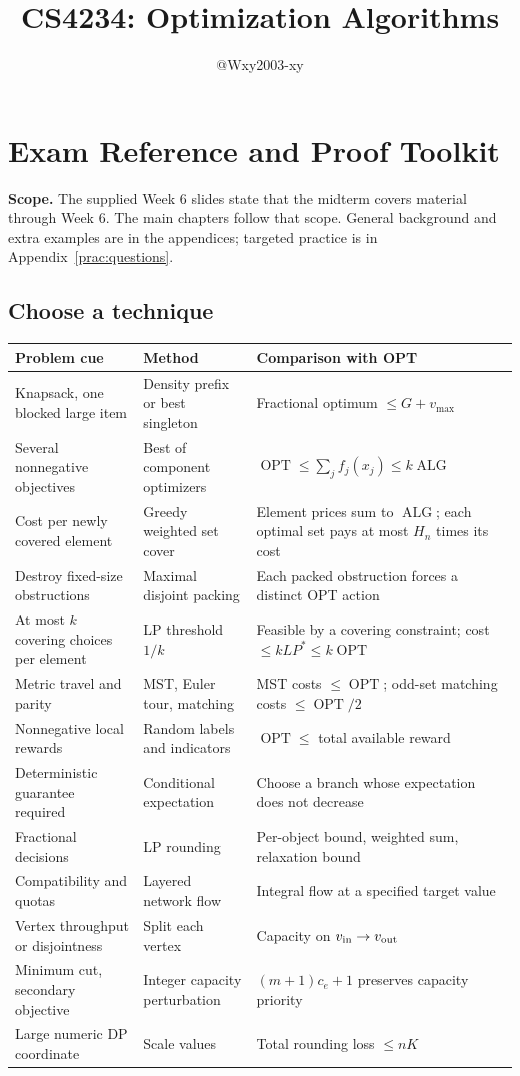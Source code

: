\documentclass[10pt]{article}
\title{CS4234: Optimization Algorithms}
\author{@Wxy2003-xy}
\date{}
\theoremstyle{definition}
\newcommand{\OPT}{\operatorname{OPT}}
\newcommand{\ALG}{\operatorname{ALG}}
\begin{document}
\maketitle\tableofcontents\clearpage

\section{Exam Reference and Proof Toolkit}
\label{ref:toolkit}
\textbf{Scope.} The supplied Week 6 slides state that the midterm covers material through
Week 6. The main chapters follow that scope. General background and extra examples are
in the appendices; targeted practice is in Appendix~\ref{prac:questions}.

\subsection{Choose a technique}
\begin{center}
\small
\begin{tabular}{P{0.25\textwidth}P{0.29\textwidth}P{0.35\textwidth}}
\toprule
\textbf{Problem cue} & \textbf{Method} & \textbf{Comparison with OPT}\\
\midrule
Knapsack, one blocked large item & Density prefix or best singleton & Fractional optimum $\le G+v_{\max}$\\
Several nonnegative objectives & Best of component optimizers & $\OPT\le\sum_j f_j(x_j)\le k\ALG$\\
Cost per newly covered element & Greedy weighted set cover & Element prices sum to $\ALG$; each optimal set pays at most $H_n$ times its cost\\
Destroy fixed-size obstructions & Maximal disjoint packing & Each packed obstruction forces a distinct OPT action\\
At most $k$ covering choices per element & LP threshold $1/k$ & Feasible by a covering constraint; cost $\le kLP^*\le k\OPT$\\
Metric travel and parity & MST, Euler tour, matching & MST costs $\le\OPT$; odd-set matching costs $\le\OPT/2$\\
Nonnegative local rewards & Random labels and indicators & $\OPT\le$ total available reward\\
Deterministic guarantee required & Conditional expectation & Choose a branch whose expectation does not decrease\\
Fractional decisions & LP rounding & Per-object bound, weighted sum, relaxation bound\\
Compatibility and quotas & Layered network flow & Integral flow at a specified target value\\
Vertex throughput or disjointness & Split each vertex & Capacity on $v_{\rm in}\to v_{\rm out}$\\
Minimum cut, secondary objective & Integer capacity perturbation & $(m+1)c_e+1$ preserves capacity priority\\
Large numeric DP coordinate & Scale values & Total rounding loss $\le nK$\\
\bottomrule
\end{tabular}
\end{center}
\end{document}
